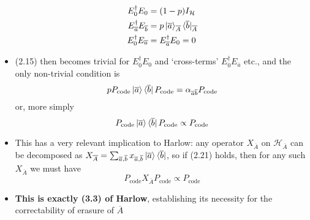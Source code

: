 \documentclass[12pt,a4paper]{article}
\numberwithin{equation}{section}
\newcommand{\ketbra}[2]{\ket{#1}\bra{#2}}
\newcommand{\Pc}{P_{\text{code}}}
\begin{document}
\begin{itemize}
\begin{equation}
			\begin{aligned}
				E_{0}^{\dagger}E_{0}&=(1-p)I_{\mathcal{H}}\\
				E_{\overline{a}}^{\dagger}E_{\overline{b}}&=p\ket{\overline{a}}_{\overline{A}}\bra{\overline{b}}_{\overline{A}}\\
				E_{0}^{\dagger}E_{\overline{a}}&=E_{\overline{a}}^{\dagger}E_{0}=0
			\end{aligned}
		\end{equation}
		\item (2.15) then becomes trivial for $E_{0}^{\dagger}E_{0}$ and `cross-terms' $E_{0}^{\dagger}E_{\overline{a}}$ etc., and the only non-trivial condition is
		\begin{equation}
			p\Pc\ketbra{\overline{a}}{\overline{b}}\Pc=\alpha_{\overline{a}\overline{b}}\Pc 
		\end{equation}
		or, more simply
		\begin{equation}
			\Pc\ketbra{\overline{a}}{\overline{b}}\Pc\propto\Pc
		\end{equation}
		\item This has a very relevant implication to Harlow: any operator $X_{\overline{A}}$ on $\mathcal{H}_{\overline{A}}$ can be decomposed as $X_{\overline{A}}=\sum_{\overline{a},\overline{b}}x_{\overline{a},\overline{b}}\ketbra{\overline{a}}{\overline{b}}$, so if (2.21) holds, then for any such $X_{\overline{A}}$ we must have
		\begin{equation}
			\Pc X_{\overline{A}}\Pc\propto\Pc
		\end{equation}
		\item \textbf{This is exactly (3.3) of Harlow}, establishing its necessity for the correctability of erasure of $\overline{A}$
	\end{itemize}
\end{document}
